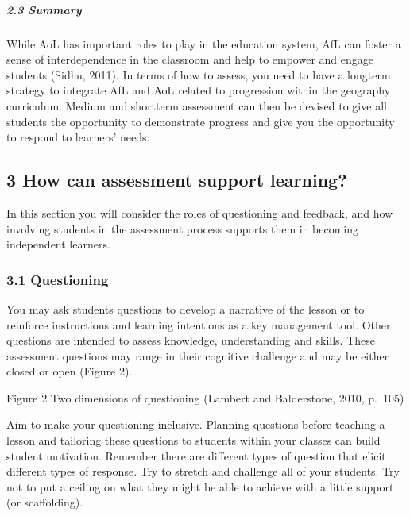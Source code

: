 \documentclass[letterpaper,10pt,english]{sphinxmanual}
\let\sphinxpxdimen\pdfpxdimen\else\newdimen\sphinxpxdimen
\begin{document}
\subparagraph{2.3 Summary}
\label{\detokenize{content/session_00/Part_00_02:2.3-Summary}}
While AoL has important roles to play in the education system, AfL can foster a sense of interdependence in the classroom and help to empower and engage students (Sidhu, 2011). In terms of how to assess, you need to have a long\sphinxhyphen{}term strategy to integrate AfL and AoL related to progression within the geography curriculum. Medium\sphinxhyphen{} and short\sphinxhyphen{}term assessment can then be devised to give all students the opportunity to demonstrate progress and give you the opportunity to respond to learners’ needs.


\subsection{3 How can assessment support learning?}
\label{\detokenize{content/session_00/Part_00_03:3-How-can-assessment-support-learning?}}\label{\detokenize{content/session_00/Part_00_03::doc}}
In this section you will consider the roles of questioning and feedback, and how involving students in the assessment process supports them in becoming independent learners.


\subsubsection{3.1 Questioning}
\label{\detokenize{content/session_00/Part_00_03:3.1-Questioning}}
You may ask students questions to develop a narrative of the lesson or to reinforce instructions and learning intentions as a key management tool. Other questions are intended to assess knowledge, understanding and skills. These assessment questions may range in their cognitive challenge and may be either closed or open (Figure 2).

\sphinxincludegraphics[width=512\sphinxpxdimen,height=410\sphinxpxdimen]{{pgce_geography_assessment_fig02}.gif}

Figure 2 Two dimensions of questioning (Lambert and Balderstone, 2010, p. 105)

Aim to make your questioning inclusive. Planning questions before teaching a lesson and tailoring these questions to students within your classes can build student motivation. Remember there are different types of question that elicit different types of response. Try to stretch and challenge all of your students. Try not to put a ceiling on what they might be able to achieve with a little support (or scaffolding).
\end{document}
